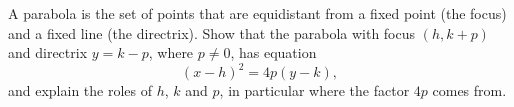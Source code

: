 A parabola is the set of points that are equidistant from a fixed point (the focus) and a fixed line (the directrix). Show that the parabola with focus $(h,k+p)$ and directrix $y=k-p$, where $p\ne0$, has equation
\[(x-h)^2=4p(y-k),\]
and explain the roles of $h$, $k$ and $p$, in particular where the factor $4p$ comes from.
